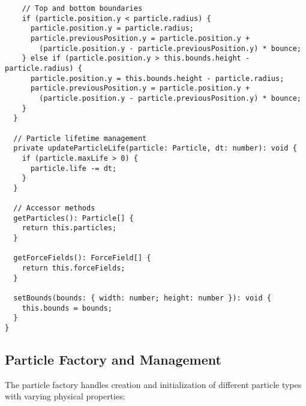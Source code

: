 \documentclass[12pt,journal,onecolumn]{IEEEtran}
\begin{document}
\begin{verbatim}
    // Top and bottom boundaries
    if (particle.position.y < particle.radius) {
      particle.position.y = particle.radius;
      particle.previousPosition.y = particle.position.y + 
        (particle.position.y - particle.previousPosition.y) * bounce;
    } else if (particle.position.y > this.bounds.height - particle.radius) {
      particle.position.y = this.bounds.height - particle.radius;
      particle.previousPosition.y = particle.position.y + 
        (particle.position.y - particle.previousPosition.y) * bounce;
    }
  }

  // Particle lifetime management
  private updateParticleLife(particle: Particle, dt: number): void {
    if (particle.maxLife > 0) {
      particle.life -= dt;
    }
  }

  // Accessor methods
  getParticles(): Particle[] {
    return this.particles;
  }

  getForceFields(): ForceField[] {
    return this.forceFields;
  }

  setBounds(bounds: { width: number; height: number }): void {
    this.bounds = bounds;
  }
}
\end{verbatim}

\subsection{Particle Factory and Management}
\label{app:particle-factory}

The particle factory handles creation and initialization of different particle types with varying physical properties:
\end{document}
